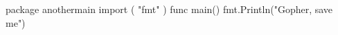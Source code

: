 \documentclass[10pt]{article}
\begin{document}
\begin{minipage}[t]{.25\textwidth}
    \begin{codebox}
        \begin{gocode}
            package anothermain
            import (
            "fmt"
            )
            func main() {
                fmt.Println("Gopher, save me")
            }
        \end{gocode}
    \end{codebox}
\end{minipage}
\end{document}
